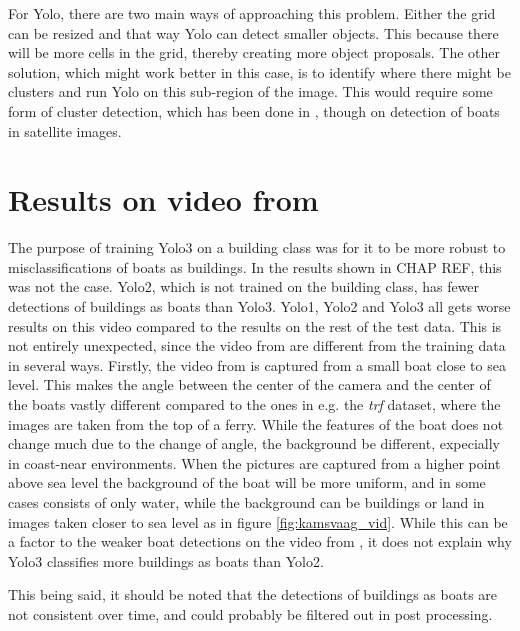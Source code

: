 \vspace{3mm}

For Yolo, there are two main ways of approaching this problem. Either the grid can be resized and that way Yolo can detect smaller objects. This because there will be more cells in the grid, thereby creating more object proposals. The other solution, which might work better in this case, is to identify where there might be clusters and run Yolo on this sub-region of the image. This would require some form of cluster detection, which has been done in \citep{VanEtten}, though on detection of boats in satellite images. 

\section{Results on video from \citep{Kamsvag2018}}

The purpose of training Yolo3 on a building class was for it to be more robust to misclassifications of boats as buildings. In the results shown in CHAP REF, this was not the case. Yolo2, which is not trained on the building class, has fewer detections of buildings as boats than Yolo3. Yolo1, Yolo2 and Yolo3 all gets worse results on this video compared to the results on the rest of the test data. This is not entirely unexpected, since the video from \citep{Kamsvag2018} are different from the training data in several ways. Firstly, the video from \citep{Kamsvag2018} is captured from a small boat close to sea level. This makes the angle between the center of the camera and the center of the boats vastly different compared to the ones in e.g. the \textit{trf} dataset, where the images are taken from the top of a ferry. While the features of the boat does not change much due to the change of angle, the background be different, expecially in coast-near environments. When the pictures are captured from a higher point above sea level the background of the boat will be more uniform, and in some cases consists of only water, while the background can be buildings or land in images taken closer to sea level as in figure \ref{fig:kamsvaag_vid}. While this can be a factor to the weaker boat detections on the video from \citep{Kamsvag2018}, it does not explain why Yolo3 classifies more buildings as boats than Yolo2.

\vspace{3mm}

This being said, it should be noted that the detections of buildings as boats are not consistent over time, and could probably be filtered out in post processing.